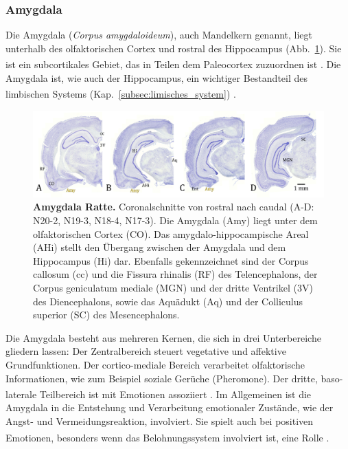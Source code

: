 \documentclass[12pt,a4paper,pdftex]{article}
\begin{document}
\subsubsection{Amygdala}
\label{subsubsec:Amygdala} 

Die Amygdala (\textit{Corpus amygdaloideum}), auch Mandelkern genannt, liegt unterhalb des olfaktorischen Cortex und rostral des Hippocampus (Abb.~\ref{fig:amygdala_ratte}). Sie ist ein subcortikales Gebiet, das in Teilen dem Paleocortex zuzuordnen ist \textsuperscript{\cite[9]{trepel2011neuroanatomie}}. Die Amygdala ist, wie auch der Hippocampus, ein wichtiger Bestandteil des limbischen Systems (Kap.~\ref{subsec:limisches_system}) \textsuperscript{\cite[15]{kandel2013principles}}.

\begin{figure}[H]
    \centering
    \includegraphics[width=\textwidth]{pictures/Bilder_Jule/Ratte/amygdala.png}
    \caption[Amygdala Ratte]{\textbf{Amygdala Ratte.} Coronalschnitte von rostral nach caudal (A-D: N20-2, N19-3, N18-4, N17-3). Die Amygdala (Amy) liegt unter dem olfaktorischen Cortex (CO). Das amygdalo-hippocampische Areal (AHi) stellt den Übergang zwischen der Amygdala und dem Hippocampus (Hi) dar. Ebenfalls gekennzeichnet sind der Corpus callosum (cc) und die Fissura rhinalis (RF) des Telencephalons, der Corpus geniculatum mediale (MGN) und der dritte Ventrikel (3V) des Diencephalons, sowie das Aquädukt (Aq) und der Colliculus superior (SC) des Mesencephalons.}
    \label{fig:amygdala_ratte}
\end{figure}{}

\noindent Die Amygdala besteht aus mehreren Kernen, die sich in drei Unterbereiche gliedern lassen: Der Zentralbereich steuert vegetative und affektive Grundfunktionen. Der cortico-mediale Bereich verarbeitet olfaktorische Informationen, wie zum Beispiel soziale Gerüche (Pheromone). Der dritte, baso-laterale Teilbereich ist mit Emotionen assoziiert \textsuperscript{\cite[6]{storch2012lehrbuchzoo}}. Im Allgemeinen ist die Amygdala in die Entstehung und Verarbeitung emotionaler Zustände, wie der Angst- und   Vermeidungsreaktion, involviert. Sie spielt auch bei positiven Emotionen, besonders wenn das Belohnungssystem involviert ist, eine Rolle \textsuperscript{\cite[48]{kandel2013principles}}.\\
\end{document}
